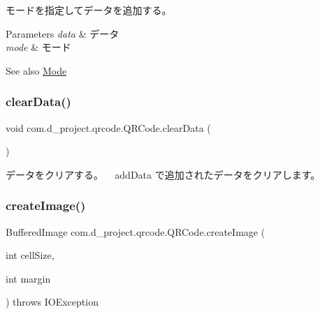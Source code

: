モードを指定してデータを追加する。 
\begin{DoxyParams}{Parameters}
{\em data} & データ \\
\hline
{\em mode} & モード \\
\hline
\end{DoxyParams}
\begin{DoxySeeAlso}{See also}
\hyperlink{interfacecom_1_1d__project_1_1qrcode_1_1_mode}{Mode} 
\end{DoxySeeAlso}
\mbox{\label{classcom_1_1d__project_1_1qrcode_1_1_q_r_code_a0d24014f5527224c63e13a6f671e8365}} 
\subsubsection{\texorpdfstring{clear\+Data()}{clearData()}}
{\footnotesize\ttfamily void com.\+d\+\_\+project.\+qrcode.\+Q\+R\+Code.\+clear\+Data (\begin{DoxyParamCaption}{ }\end{DoxyParamCaption})\hspace{0.3cm}{\ttfamily [inline]}}

データをクリアする。 ~\newline
add\+Data で追加されたデータをクリアします。 \mbox{\label{classcom_1_1d__project_1_1qrcode_1_1_q_r_code_a7b60e442e66eef831ba7c7dcf6c25245}} 
\subsubsection{\texorpdfstring{create\+Image()}{createImage()}}
{\footnotesize\ttfamily Buffered\+Image com.\+d\+\_\+project.\+qrcode.\+Q\+R\+Code.\+create\+Image (\begin{DoxyParamCaption}\item[{int}]{cell\+Size,  }\item[{int}]{margin }\end{DoxyParamCaption}) throws I\+O\+Exception\hspace{0.3cm}{\ttfamily [inline]}}

